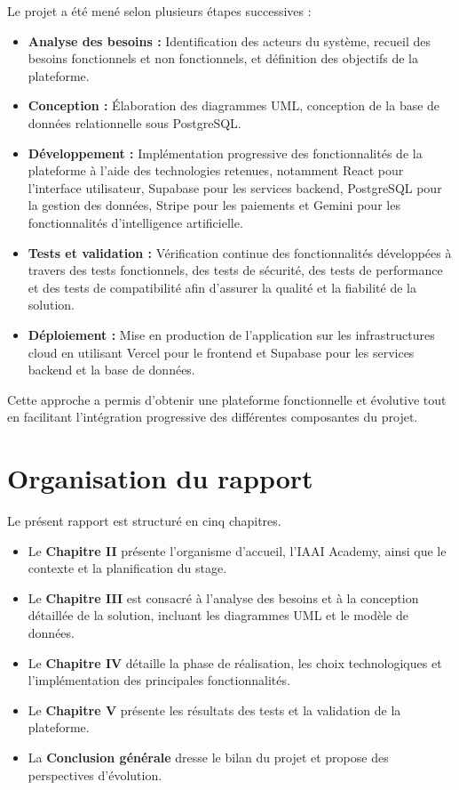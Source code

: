 \documentclass[12pt, a4paper]{report}
\begin{document}
Le projet a été mené selon plusieurs étapes successives :

\begin{itemize}
    \item \textbf{Analyse des besoins :} Identification des acteurs du système, recueil des besoins fonctionnels et non fonctionnels, et définition des objectifs de la plateforme.

    \item \textbf{Conception :} Élaboration des diagrammes UML, conception de la base de données relationnelle sous PostgreSQL.

    \item \textbf{Développement :} Implémentation progressive des fonctionnalités de la plateforme à l'aide des technologies retenues, notamment React pour l'interface utilisateur, Supabase pour les services backend, PostgreSQL pour la gestion des données, Stripe pour les paiements et Gemini pour les fonctionnalités d'intelligence artificielle.

    \item \textbf{Tests et validation :} Vérification continue des fonctionnalités développées à travers des tests fonctionnels, des tests de sécurité, des tests de performance et des tests de compatibilité afin d'assurer la qualité et la fiabilité de la solution.

    \item \textbf{Déploiement :} Mise en production de l'application sur les infrastructures cloud en utilisant Vercel pour le frontend et Supabase pour les services backend et la base de données.
\end{itemize}

Cette approche a permis d'obtenir une plateforme fonctionnelle et évolutive tout en facilitant l'intégration progressive des différentes composantes du projet.

\section{Organisation du rapport}
Le présent rapport est structuré en cinq chapitres.
\begin{itemize}
    \item Le \textbf{Chapitre II} présente l'organisme d'accueil, l'IAAI Academy,
    ainsi que le contexte et la planification du stage.
    \item Le \textbf{Chapitre III} est consacré à l'analyse des besoins et à la
    conception détaillée de la solution, incluant les diagrammes UML et le modèle
    de données.
    \item Le \textbf{Chapitre IV} détaille la phase de réalisation, les choix
    technologiques et l'implémentation des principales fonctionnalités.
    \item Le \textbf{Chapitre V} présente les résultats des tests et la validation
    de la plateforme.
    \item La \textbf{Conclusion générale} dresse le bilan du projet et propose des
    perspectives d'évolution.
\end{itemize}
\end{document}

